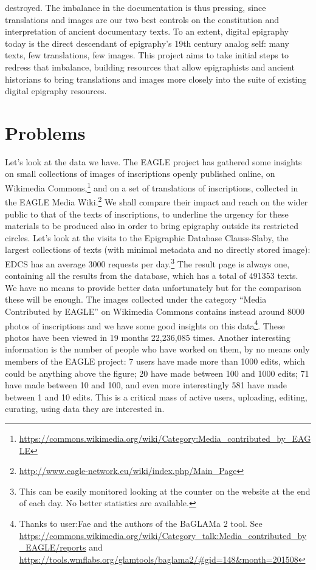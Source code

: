\documentclass[amsthm,ebook]{saparticle}
\begin{document}
destroyed. The imbalance in the documentation is thus pressing, since translations and images are our two best controls on the constitution and interpretation of ancient documentary texts. To an extent, digital epigraphy today is the direct descendant of epigraphy’s 19th century analog self: many texts, few translations, few images. This project aims to take initial steps to redress that imbalance, building resources that allow epigraphists and ancient historians to bring translations and images more closely into the suite of existing digital epigraphy resources.



\section{Problems}
\noindent Let's look at the data we have. The EAGLE project has gathered some insights on small collections of images of inscriptions openly published online, on Wikimedia Commons,\footnote{\url{https://commons.wikimedia.org/wiki/Category:Media_contributed_by_EAGLE}} and on a set of translations of inscriptions, collected in the EAGLE Media Wiki.\footnote{\citet{Liuzzo2014} \url{http://www.eagle-network.eu/wiki/index.php/Main_Page}} We shall compare their impact and reach on the wider public to that of the texts of inscriptions, to underline the urgency for these materials to be produced also in order to bring epigraphy outside its restricted circles.
Let's look at the visits to the Epigraphic Database Clauss-Slaby, the largest collections of texts (with minimal metadata and no directly stored image): EDCS has an average 3000 requests per day.\footnote{This can be easily monitored looking at the counter on the website at the end of each day. No better statistics are available.} The result page is always one, containing all the results from the database, which has a total of 491353 texts. We have no means to provide better data unfortunately but for the comparison these will be enough. The images collected under the category ``Media Contributed by EAGLE'' on Wikimedia Commons contains instead around 8000 photos of inscriptions and we have some good insights on this data\footnote{Thanks to user:Fae and the authors of the BaGLAMa 2 tool. See \url{https://commons.wikimedia.org/wiki/Category_talk:Media_contributed_by_EAGLE/reports} and \url{https://tools.wmflabs.org/glamtools/baglama2/\#gid=148\&month=201508}}. These photos have been viewed in 19 months 22,236,085 times. Another interesting information is the number of people who have worked on them, by no means only members of the EAGLE project: 7 users have made more than 1000 edits, which could be anything above the figure; 20 have made between 100 and 1000 edits; 71 have made between 10 and 100, and even more interestingly 581 have made between 1 and 10 edits. This is a critical mass of active users, uploading, editing, curating, using data they are interested in. 
\end{document}

